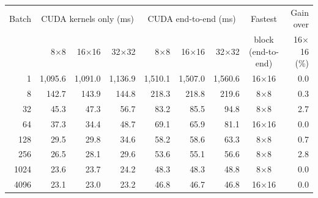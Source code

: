 \begin{tabular}{rrrrrrrcr}
\toprule
Batch & \multicolumn{3}{c}{CUDA kernels only (ms)} & \multicolumn{3}{c}{CUDA end-to-end (ms)} & Fastest & Gain over \\
\cmidrule(lr){2-4}\cmidrule(lr){5-7}
 & 8$\times$8 & 16$\times$16 & 32$\times$32 & 8$\times$8 & 16$\times$16 & 32$\times$32 & block (end-to-end) & 16$\times$16 (\%) \\
\midrule
1 & 1{,}095.6 & 1{,}091.0 & 1{,}136.9 & 1{,}510.1 & 1{,}507.0 & 1{,}560.6 & 16$\times$16 & 0.0 \\
8 & 142.7 & 143.9 & 144.8 & 218.3 & 218.8 & 219.6 & 8$\times$8 & 0.3 \\
32 & 45.3 & 47.3 & 56.7 & 83.2 & 85.5 & 94.8 & 8$\times$8 & 2.7 \\
64 & 37.3 & 34.4 & 48.7 & 69.1 & 65.9 & 81.1 & 16$\times$16 & 0.0 \\
128 & 29.5 & 29.8 & 34.6 & 58.2 & 58.6 & 63.3 & 8$\times$8 & 0.7 \\
256 & 26.5 & 28.1 & 29.6 & 53.6 & 55.1 & 56.6 & 8$\times$8 & 2.8 \\
1024 & 23.6 & 23.7 & 24.2 & 48.3 & 48.3 & 48.8 & 8$\times$8 & 0.0 \\
4096 & 23.1 & 23.0 & 23.2 & 46.8 & 46.7 & 46.8 & 16$\times$16 & 0.0 \\
\bottomrule
\end{tabular}
